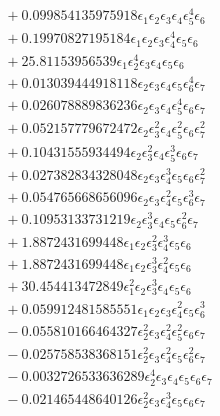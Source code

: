 \documentclass[10pt]{article}
\begin{document}
\begin{align*}
&{}  + 0.099854135975918 \epsilon_{1} \epsilon_{2} \epsilon_{3} \epsilon_{4} \epsilon_{5}^{4} \epsilon_{6} \\
&{}  + 0.19970827195184 \epsilon_{1} \epsilon_{2} \epsilon_{3} \epsilon_{4}^{4} \epsilon_{5} \epsilon_{6} \\
&{}  + 25.81153956539 \epsilon_{1} \epsilon_{2}^{4} \epsilon_{3} \epsilon_{4} \epsilon_{5} \epsilon_{6} \\
&{}  + 0.013039444918118 \epsilon_{2} \epsilon_{3} \epsilon_{4} \epsilon_{5} \epsilon_{6}^{4} \epsilon_{7} \\
&{}  + 0.026078889836236 \epsilon_{2} \epsilon_{3} \epsilon_{4} \epsilon_{5}^{4} \epsilon_{6} \epsilon_{7} \\
&{}  + 0.052157779672472 \epsilon_{2} \epsilon_{3}^{2} \epsilon_{4} \epsilon_{5}^{2} \epsilon_{6} \epsilon_{7}^{2} \\
&{}  + 0.10431555934494 \epsilon_{2} \epsilon_{3}^{2} \epsilon_{4} \epsilon_{5}^{3} \epsilon_{6} \epsilon_{7} \\
&{}  + 0.027382834328048 \epsilon_{2} \epsilon_{3} \epsilon_{4}^{3} \epsilon_{5} \epsilon_{6} \epsilon_{7}^{2} \\
&{}  + 0.054765668656096 \epsilon_{2} \epsilon_{3} \epsilon_{4}^{2} \epsilon_{5} \epsilon_{6}^{3} \epsilon_{7} \\
&{}  + 0.10953133731219 \epsilon_{2} \epsilon_{3}^{3} \epsilon_{4} \epsilon_{5} \epsilon_{6}^{2} \epsilon_{7} \\
&{}  + 1.8872431699448 \epsilon_{1} \epsilon_{2} \epsilon_{3}^{2} \epsilon_{4}^{3} \epsilon_{5} \epsilon_{6} \\
&{}  + 1.8872431699448 \epsilon_{1} \epsilon_{2} \epsilon_{3}^{3} \epsilon_{4}^{2} \epsilon_{5} \epsilon_{6} \\
&{}  + 30.454413472849 \epsilon_{1}^{2} \epsilon_{2} \epsilon_{3}^{3} \epsilon_{4} \epsilon_{5} \epsilon_{6} \\
&{}  + 0.059912481585551 \epsilon_{1} \epsilon_{2} \epsilon_{3} \epsilon_{4}^{2} \epsilon_{5} \epsilon_{6}^{3} \\
&{}  - 0.055810166464327 \epsilon_{2}^{2} \epsilon_{3} \epsilon_{4}^{2} \epsilon_{5}^{2} \epsilon_{6} \epsilon_{7} \\
&{}  - 0.025758538368151 \epsilon_{2}^{2} \epsilon_{3} \epsilon_{4}^{2} \epsilon_{5} \epsilon_{6}^{2} \epsilon_{7} \\
&{}  - 0.0032726533636289 \epsilon_{2}^{4} \epsilon_{3} \epsilon_{4} \epsilon_{5} \epsilon_{6} \epsilon_{7} \\
&{}  - 0.021465448640126 \epsilon_{2}^{2} \epsilon_{3} \epsilon_{4}^{3} \epsilon_{5} \epsilon_{6} \epsilon_{7} \\

\end{align*}
\end{document}
